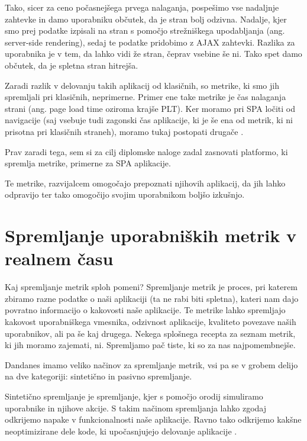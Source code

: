 \documentclass[a4paper, 12pt]{book}
\begin{document}
Tako, sicer za ceno počasnejšega prvega nalaganja, pospešimo vse nadaljnje zahtevke in damo uporabniku občutek, da je stran bolj odzivna. Nadalje, kjer smo prej podatke izpisali na stran s pomočjo strežniškega upodabljanja (ang. server-side rendering), sedaj te podatke pridobimo z AJAX zahtevki. Razlika za uporabnika je v tem, da lahko vidi že stran, čeprav vsebine še ni. Tako spet damo občutek, da je spletna stran hitrejša.

Zaradi razlik v delovanju takih aplikacij od klasičnih, so metrike, ki smo jih spremljali pri klasičnih, neprimerne. Primer ene take metrike je čas nalaganja strani (ang. page load time oziroma krajše PLT). Ker moramo pri SPA ločiti  od  navigacije (saj  vsebuje tudi zagonski čas aplikacije, ki je še ena od metrik, ki ni prisotna pri klasičnih straneh), moramo tukaj postopati drugače \cite{hard_vs_soft_navigation}.

Prav zaradi tega, sem si za cilj diplomske naloge zadal zasnovati platformo, ki spremlja metrike, primerne za SPA aplikacije.

Te metrike, razvijalcem omogočajo prepoznati  njihovih aplikacij, da jih lahko odpravijo ter tako omogočijo svojim uporabnikom boljšo izkušnjo.



\chapter{Spremljanje uporabniških metrik v realnem času}
\label{ch0}
Kaj spremljanje metrik sploh pomeni? Spremljanje metrik je proces, pri katerem zbiramo razne podatke o naši aplikaciji (ta ne rabi biti spletna), kateri nam dajo povratno informacijo o kakovosti naše aplikacije. Te metrike lahko spremljajo kakovost uporabniškega vmesnika, odzivnost aplikacije,  kvaliteto povezave naših uporabnikov, ali pa še kaj drugega. Nekega splošnega recepta za seznam metrik, ki jih moramo zajemati, ni. Spremljamo pač tiste, ki so za nas najpomembnejše.

Dandanes imamo veliko načinov za spremljanje metrik, vsi pa se v grobem delijo na dve kategoriji: sintetično in pasivno spremljanje.

Sintetično spremljanje je spremljanje, kjer s pomočjo orodij simuliramo uporabnike in njihove akcije. S takim načinom spremljanja lahko zgodaj odkrijemo napake v funkcionalnosti naše aplikacije. Ravno tako odkrijemo kakšne neoptimizirane dele kode, ki upočasnjujejo delovanje aplikacije \cite{what_is_rum}.
\end{document}
